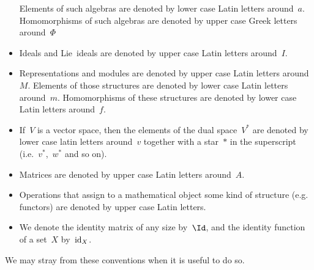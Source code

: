 \begin{itemize}
		Elements of such algebras are denoted by lower case Latin letters around~$a$.
		Homomorphisms of such algebras are denoted by upper case Greek letters around~$\Phi$
	\item
		Ideals and Lie~ideals are denoted by upper case Latin letters around~$I$.
	\item
		Representations and modules are denoted by upper case Latin letters around~$M$.
		Elements of those structures are denoted by lower case Latin letters around~$m$.
		Homomorphisms of these structures are denoted by lower case Latin letters around~$f$.
	\item
		If~$V$ is a vector space, then the elements of the dual space~$V^*$ are denoted by lower case latin letters around~$v$ together with a star~$*$ in the superscript (i.e.~$v^*$,~$w^*$ and so on).
	\item
		Matrices are denoted by upper case Latin letters around~$A$.
	\item
		Operations that assign to a mathematical object some kind of structure (e.g. functors) are denoted by upper case Latin letters.
	\item
		We denote the identity matrix of any size by~$\Id$, and the identity function of a set~$X$ by~$\mathrm{id}_X$.
\end{itemize}

We may stray from these conventions when it is useful to do so.
